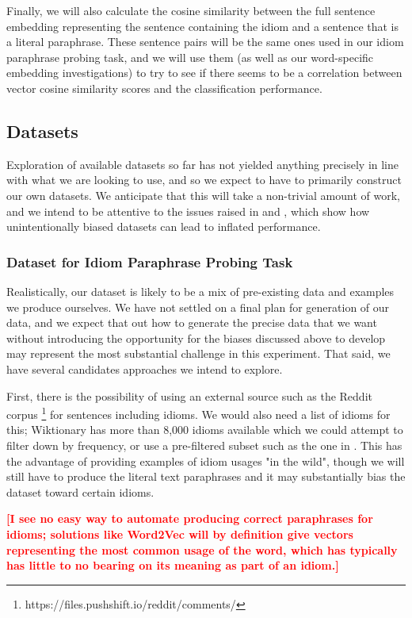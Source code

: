 \documentclass[11pt,a4paper]{article}
\newcommand{\comment}[1]{\textcolor{red}{\bf \small [#1]}}
\begin{document}
 Finally, we will also calculate the cosine similarity between the full sentence embedding representing the sentence containing the idiom and a sentence that is a literal paraphrase. These sentence pairs will be the same ones used in our idiom paraphrase probing task, and we will use them (as well as our word-specific embedding investigations) to try to see if there seems to be a correlation between vector cosine similarity scores and the classification performance.

\subsection{Datasets}
Exploration of available datasets so far has not yielded anything precisely in line with what we are looking to use, and so we expect to have to primarily construct our own datasets. We anticipate that this will take a non-trivial amount of work, and we intend to be attentive to the issues raised in \citep{niven2019probing} and \citep{mccoy2019right}, which show how unintentionally biased datasets can lead to inflated performance.

\subsubsection{Dataset for Idiom Paraphrase Probing Task}
\vspace{5mm}
Realistically, our dataset is likely to be a mix of pre-existing data and examples we produce ourselves. We have not settled on a final plan for generation of our data, and we expect that out how to generate the precise data that we want without introducing the opportunity for the biases discussed above to develop may represent the most substantial challenge in this experiment. That said, we have several candidates approaches we intend to explore.

First, there is the possibility of using an external source such as the Reddit corpus \footnote{https://files.pushshift.io/reddit/comments/} for sentences including idioms. We would also need a list of idioms for this; Wiktionary has more than 8,000 idioms available which we could attempt to filter down by frequency, or use a pre-filtered subset such as the one in \cite{Jochim2018SLIDEA}. This has the advantage of providing examples of idiom usages "in the wild", though we will still have to produce the literal text paraphrases and it may substantially bias the dataset toward certain idioms. 

\comment{I see no easy way to automate producing correct paraphrases for idioms; solutions like Word2Vec will by definition give vectors representing the most common usage of the word, which has typically has little to no bearing on its meaning as part of an idiom.}
\end{document}
